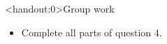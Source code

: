 \documentclass[xcolor=table, aspectratio=169, bigger]{beamer}
\begin{document}
\begin{frame}<handout:0>{Group work}
\begin{block}{}
\begin{itemize}
\item Complete all parts of question 4.
\end{itemize}
\end{block}
\end{frame}
\end{document}
